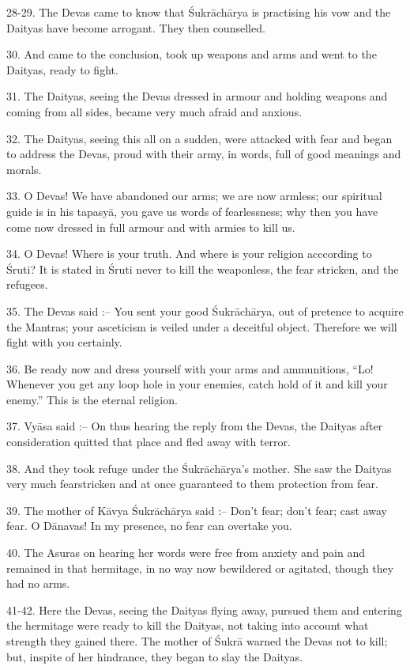 28-29. The Devas came to know that \'Sukr\=ach\=arya is practising his vow and the Daityas have become arrogant. They then counselled.

30. And came to the conclusion, took up weapons and arms and went to the Daityas, ready to fight.

31. The Daityas, seeing the Devas dressed in armour and holding weapons and coming from all sides, became very much afraid and anxious.

32. The Daityas, seeing this all on a sudden, were attacked with fear and began to address the Devas, proud with their army, in words, full of good meanings and morals.

33. O Devas! We have abandoned our arms; we are now armless; our spiritual guide is in his tapasy\=a, you gave us words of fearlessness; why then you have come now dressed in full armour and with armies to kill us.

34. O Devas! Where is your truth. And where is your religion acccording to \'Sruti? It is stated in \'Sruti never to kill the weaponless, the fear stricken, and the refugees.

35. The Devas said :-- You sent your good \'Sukr\=ach\=arya, out of pretence to acquire the Mantras; your asceticism is veiled under a deceitful object. Therefore we will fight with you certainly.

36. Be ready now and dress yourself with your arms and ammunitions, ``Lo! Whenever you get any loop hole in your enemies, catch hold of it and kill your enemy.'' This is the eternal religion.

37. Vy\=asa said :-- On thus hearing the reply from the Devas, the Daityas after consideration quitted that place and fled away with terror.

38. And they took refuge under the \'Sukr\=ach\=arya's mother. She saw the Daityas very much fearstricken and at once guaranteed to them protection from fear.

39. The mother of K\=avya \'Sukr\=ach\=arya said :-- Don't fear; don't fear; cast away fear. O D\=anavas! In my presence, no fear can overtake you.

40. The Asuras on hearing her words were free from anxiety and pain and remained in that hermitage, in no way now bewildered or agitated, though they had no arms.

41-42. Here the Devas, seeing the Daityas flying away, pursued them and entering the hermitage were ready to kill the Daityas, not taking into account what strength they gained there. The mother of \'Sukr\=a warned the Devas not to kill; but, inspite of her hindrance, they began to slay the Daityas.

